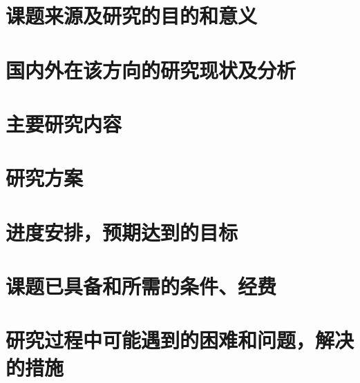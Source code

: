 \documentclass{Proposal}
\begin{document}
\maketitle

\newpage

\section{课题来源及研究的目的和意义}

\section{国内外在该方向的研究现状及分析}

\section{主要研究内容}

\section{研究方案}

\section{进度安排，预期达到的目标}

\section{课题已具备和所需的条件、经费}

\section{研究过程中可能遇到的困难和问题，解决的措施}

\appendix


\end{document}
